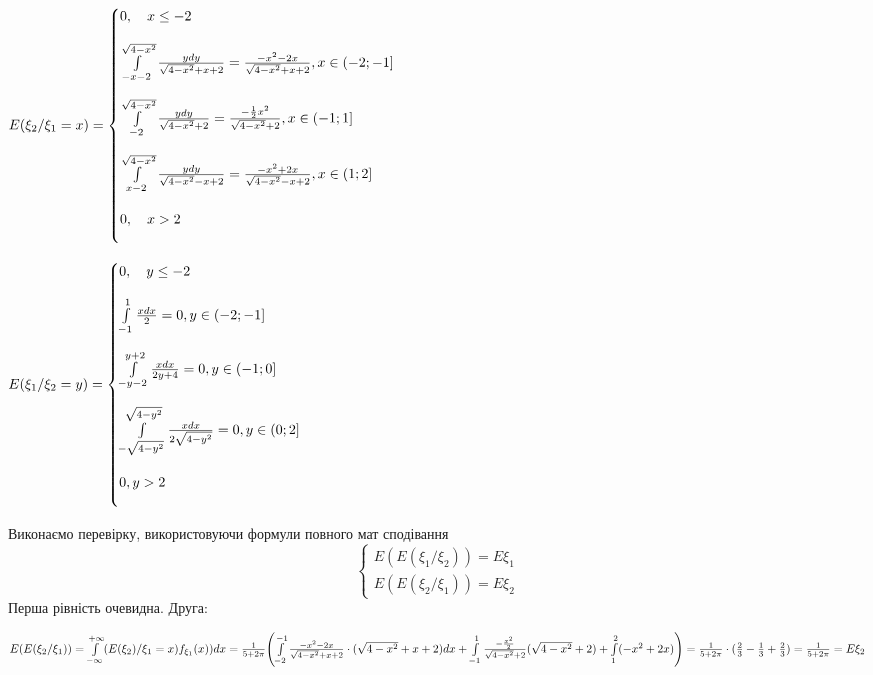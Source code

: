 \documentclass[a4paper, 20pt, titlepage]{article}
\begin{document}
\begin{spacing}{1.4}
$
E(\xi_2/\xi_1 =x )= 
\begin{cases}
\vspace{4mm}
0, \quad x \leq -2 \\ \vspace{4mm}
\q{-x-2}{\sqrt{4-x^2}}{\frac{ydy}{\sqrt{4-x^2} +x + 2}} = \frac{-x^2-2x}{\sqrt{4-x^2} +x + 2}, x \in (-2;-1]  \\ \vspace{4mm}
\q{-2}{\sqrt{4-x^2}}{\frac{ydy}{\sqrt{4-x^2}+2}} = \frac{-\frac{1}{2}x^2}{\sqrt{4-x^2}+2}, x \in (-1;1] \\ \vspace{4mm}
\q{x-2}{\sqrt{4-x^2}}{\frac{ydy}{\sqrt{4-x^2} -x + 2} } = \frac{-x^2 + 2x}{\sqrt{4-x^2} -x + 2}, x \in (1;2] \\ \vspace{4mm}
0, \quad x > 2
\end{cases}
$

\vspace{5mm}

$
E(\xi_1/\xi_2 =y )= 
\begin{cases}
\vspace{4mm}
0, \quad y \leq -2 \\ \vspace{4mm}
\q{-1}{1}{\frac{xdx}{2}} = 0, y \in (-2;-1] \\ \vspace{4mm}
\q{-y-2}{y+2}{\frac{xdx}{2y+4}} = 0, y \in (-1;0] \\ \vspace{4mm}
\q{-\sqrt{4-y^2}}{\sqrt{4-y^2}}{\frac{xdx}{2\sqrt{4-y^2}}} = 0, y \in (0;2] \\ \vspace{4mm} 
0, y > 2
\end{cases}
$

Виконаємо перевірку, використовуючи формули повного мат сподівання
$$
\begin{cases}
E(E(\xi_1/\xi_2)) = E\xi_1 \\ 
E(E(\xi_2/\xi_1)) = E\xi_2
\end{cases}
$$
Перша рівність очевидна. Друга:

$E(E(\xi_2/\xi_1)) = \int \limits_{-\infty}^{+\infty} (E(\xi_2)/\xi_1 = x)f_{\xi_1}(x))dx = \frac{1}{5+2\pi} \Biggl(\int \limits_{-2}^{-1} \frac{-x^2-2x}{\sqrt{4-x^2} + x+2}  \cdot (\sqrt{4-x^2} + x+2)dx + \int \limits_{-1}^{1} \frac{-\frac{x^2}{2}}{\sqrt{4-x^2} + 2} (\sqrt{4-x^2} + 2) +
\int \limits_{1}^{2} (-x^2+2x) \Biggr) = \frac{1}{5+2\pi} \cdot (\frac{2}{3} - \frac{1}{3} + \frac{2}{3}) = \frac{1}{5+2\pi} = E\xi_2$





\end{spacing}
\end{document}
